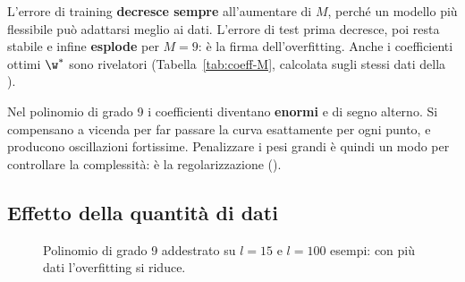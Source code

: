 L'errore di training \textbf{decresce sempre} all'aumentare di $M$, perché un modello più flessibile può
adattarsi meglio ai dati. L'errore di test prima decresce, poi resta stabile e infine \textbf{esplode} per
$M=9$: è la firma dell'overfitting. Anche i coefficienti ottimi $\w^*$ sono rivelatori
(Tabella~\ref{tab:coeff-M}, calcolata sugli stessi dati della ).

\begin{table}[ht]
\centering\small
\caption{Coefficienti ottimi $\w^*$ dei polinomi di grado $M$ della .}
\label{tab:coeff-M}

\end{table}

\begin{idea}[Pesi enormi = overfitting]
Nel polinomio di grado 9 i coefficienti diventano \textbf{enormi} e di segno alterno. Si compensano a vicenda
per far passare la curva esattamente per ogni punto, e producono oscillazioni fortissime. Penalizzare i pesi
grandi è quindi un modo per controllare la complessità: è la regolarizzazione ().
\end{idea}

\subsection{Effetto della quantità di dati}

\begin{figure}[ht]
\centering
{}
\caption{Polinomio di grado 9 addestrato su $l=15$ e $l=100$ esempi: con più dati l'overfitting si riduce.}
\label{fig:poly-dati}
\end{figure}

